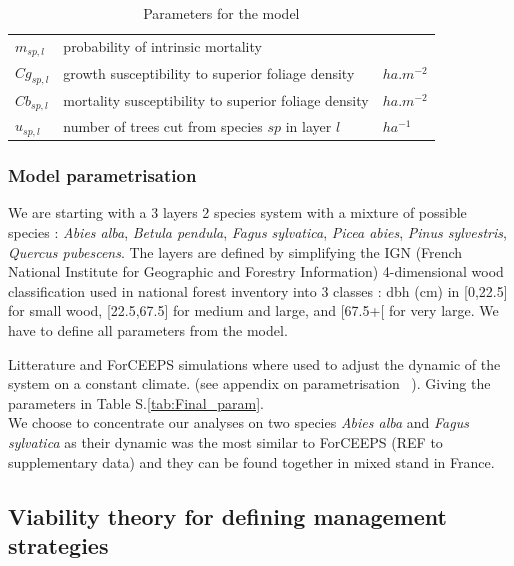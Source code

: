 \documentclass{article}
\begin{document}
\begin{table}[H]
\begin{tabular}{l l l}
    $m_{sp,l}$     & probability of intrinsic mortality           & \\
    $Cg_{sp,l}$    & growth susceptibility to superior foliage density            &   $ha.m^{-2}$  \\
    $Cb_{sp,l}$    & mortality susceptibility to superior foliage density            & $ha.m^{-2}$    \\
    $u_{sp,l}$     & number of trees cut from species $sp$ in layer $l$           & $ha^{-1}$ \\
    \hline
    \hline
    \end{tabular}
    \caption{Parameters for the model}
    \label{tab:coef}
\end{table}

\subsubsection{Model parametrisation}

We are starting with a 3 layers 2 species system with a mixture of possible species : \textit{Abies alba}, \textit{Betula pendula}, \textit{Fagus sylvatica}, \textit{Picea abies}, \textit{Pinus sylvestris}, \textit{Quercus pubescens}. The layers are defined by simplifying the IGN (French National Institute for Geographic and Forestry Information) 4-dimensional wood classification used in national forest inventory into 3 classes : dbh (cm) in [0,22.5] for small wood, [22.5,67.5] for medium and large, and [67.5+[ for very large. We have to define all parameters from the model.

Litterature and ForCEEPS simulations where used to adjust the dynamic of the system on a constant climate. (see appendix on parametrisation ~\autocite{bugmannEcologyMountainousForests1994,morinForestSuccessionGap2021}). Giving the parameters in Table S.\ref{tab:Final_param}.\\
We choose to concentrate our analyses on two species \textit{Abies alba} and \textit{Fagus sylvatica} as their dynamic was the most similar to ForCEEPS (REF to supplementary data) and they can be found together in mixed stand in France.\\

\subsection{Viability theory for defining management strategies}
\end{document}
